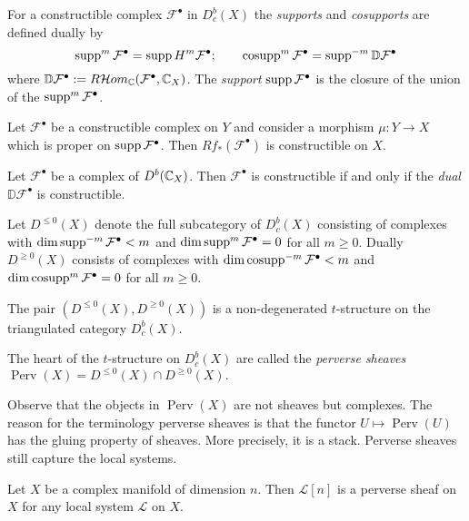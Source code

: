   For a constructible complex $\mathcal{F}^\bullet$ in $D^b_c(X)$ the {\it supports} and {\it cosupports} are defined dually by
  $$\operatorname{supp}^m\mathcal{F}^\bullet = \operatorname{supp} H^m \mathcal{F}^\bullet; \qquad \operatorname{cosupp}^m\mathcal{F}^\bullet = \operatorname{supp}^{-m}\mathbb{D}\mathcal{F}^\bullet$$
  where $\mathbb{D}\mathcal{F}^\bullet := R \mathcal{H}om_{\mathbb{C}}(\mathcal{F}^\bullet,\mathbb{C}_X)$.
  The {\it support} $\operatorname{supp} \mathcal{F}^\bullet$ is the closure of the union of the $\operatorname{supp}^m\mathcal{F}^\bullet$.
  \begin{theorem}{\cite[Theorem 4.1.5.]{dimca2004sheaves}}
    Let $\mathcal{F}^\bullet$ be a constructible complex on $Y$ and consider a morphism $\mu:Y\to X$ which is proper on $\operatorname{supp} \mathcal{F}^\bullet$.
    Then $Rf_*(\mathcal{F}^\bullet)$ is constructible on $X$.
  \end{theorem}
  \begin{theorem}{\cite[Theorem 4.1.16]{dimca2004sheaves}}
    Let $\mathcal{F}^\bullet$ be a complex of $D^b(\mathbb{C}_X)$. Then $\mathcal{F}^\bullet$ is constructible if and only if the {\it dual} $\mathbb{D}\mathcal{F}^\bullet$ is constructible.
  \end{theorem}
  Let $D^{\leq 0}(X)$ denote the full subcategory of $D^b_c(X)$ consisting of complexes with $\dim \operatorname{supp}^{-m} \mathcal{F}^\bullet < m$ and $\dim \operatorname{supp}^m \mathcal{F}^\bullet = 0$ for all $m\geq 0$.
  Dually $D^{\geq 0}(X)$ consists of complexes with $\dim \operatorname{cosupp}^{-m}\mathcal{F}^\bullet <m$ and $\dim \operatorname{cosupp}^m \mathcal{F}^\bullet = 0$ for all $m\geq 0$.
  \begin{proposition}{\cite[Proposition 5.1.12]{dimca2004sheaves}}
    The pair $(D^{\leq 0}(X), D^{\geq 0}(X))$ is a non-degenerated $t$-structure on the triangulated category $D^{b}_c(X)$.
  \end{proposition}
  \begin{definition}
    The heart of the $t$-structure on $D^b_c(X)$ are called the {\it perverse sheaves} $\operatorname{Perv}(X) = D^{\leq 0}(X)\cap D^{\geq 0}(X).$
  \end{definition}
  Observe that the objects in $\operatorname{Perv}(X)$ are not sheaves but complexes.
  The reason for the terminology perverse sheaves is that the functor $U\mapsto \operatorname{Perv}(U)$ has the gluing property of sheaves.
  More precisely, it is a stack.
  Perverse sheaves still capture the local systems.
  \begin{theorem}{\cite[Theorem 5.1.20]{dimca2004sheaves}}
    Let $X$ be a complex manifold of dimension $n$. Then $\mathcal{L}[n]$ is a perverse sheaf on $X$ for any local system $\mathcal{L}$ on $X$.
  \end{theorem}
